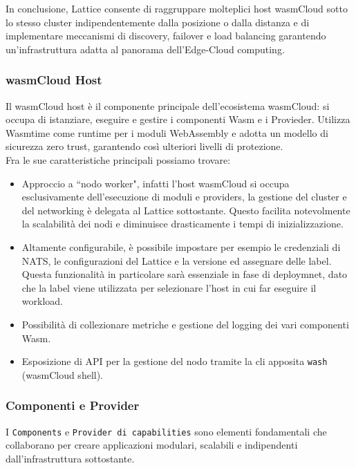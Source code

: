 In conclusione, Lattice consente di raggruppare molteplici host wasmCloud sotto lo stesso cluster indipendentemente dalla posizione o dalla distanza e di implementare meccanismi di discovery, failover e load balancing garantendo un'infrastruttura adatta al panorama dell'Edge-Cloud computing.


\subsubsection{wasmCloud Host}

Il wasmCloud host è il componente principale dell'ecosistema wasmCloud: si occupa di istanziare, eseguire e gestire i componenti Wasm e i Provieder. Utilizza Wasmtime come runtime per i moduli WebAssembly e adotta un modello di sicurezza zero trust, garantendo così ulteriori livelli di protezione.\\

Fra le sue caratteristiche principali possiamo trovare:

\begin{itemize}
    \item Approccio a ``nodo worker", infatti l'host wasmCloud si occupa esclusivamente dell'esecuzione di moduli e providers, la gestione del cluster e del networking è delegata al Lattice sottostante. Questo facilita notevolmente la scalabilità dei nodi e diminuisce drasticamente i tempi di inizializzazione.
    \item Altamente configurabile, è possibile impostare per esempio le credenziali di NATS, le configurazioni del Lattice e la versione ed assegnare delle label. Questa funzionalità in particolare sarà essenziale in fase di deploymnet, dato che la label viene utilizzata per selezionare l'host in cui far eseguire il workload.
    \item Possibilità di collezionare metriche e gestione del logging dei vari componenti Wasm.
    \item Esposizione di API per la gestione del nodo tramite la cli apposita \texttt{wash} (wasmCloud shell).
\end{itemize}

\subsubsection{Componenti e Provider}

I  \texttt{Components} e \texttt{Provider di capabilities} sono elementi fondamentali che collaborano per creare applicazioni modulari, scalabili e indipendenti dall'infrastruttura sottostante.\\
 
